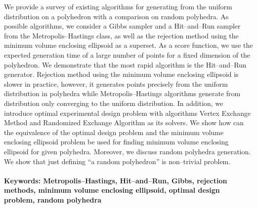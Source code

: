 \documentclass[12pt, twoside]{book}
\begin{document}
We provide a survey of existing algorithms for generating from the uniform distribution on a polyhedron with a comparison on random polyhedra. As possible algorithms, we consider a Gibbs sampler and a Hit--and--Run sampler from the Metropolis--Hastings class, as well as the rejection method using the minimum volume enclosing ellipsoid as a superset. As a score function, we use the expected generation time of a large number of points for a fixed dimension of the polyhedron. We demonstrate that the most rapid algorithm is the Hit--and--Run generator. Rejection method using the minimum volume enclosing ellipsoid is slower in practice, however, it generates points precisely from the uniform distribution in polyhedra while Metropolis--Hastings algorithms generate from distribution only converging to the uniform distribution. In addition, we introduce optimal experimental design problem with algorithms Vertex Exchange Method and Randomized Exchange Algorithm as its solvers. We show how can the equivalence of the optimal design problem and the minimum volume enclosing ellipsoid problem be used for finding minimum volume enclosing ellipsoid for given polyhedra. Moreover, we discuss random polyhedra generation. We show that just defining ``a random polyhedron'' is non--trivial problem.


\paragraph*{Keywords: Metropolis--Hastings, Hit--and--Run, Gibbs, rejection methods, minimum volume enclosing ellipsoid, optimal design problem, random polyhedra} 


%
%



\newpage 

\tableofcontents
\end{document}
